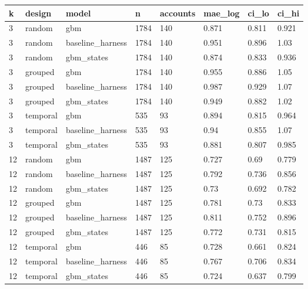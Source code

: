 \begin{tabular}{llllllll}
\toprule
k & design & model & n & accounts & mae\_log & ci\_lo & ci\_hi \\
\midrule
3 & random & gbm & 1784 & 140 & 0.871 & 0.811 & 0.921 \\
3 & random & baseline\_harness & 1784 & 140 & 0.951 & 0.896 & 1.03 \\
3 & random & gbm\_states & 1784 & 140 & 0.874 & 0.833 & 0.936 \\
3 & grouped & gbm & 1784 & 140 & 0.955 & 0.886 & 1.05 \\
3 & grouped & baseline\_harness & 1784 & 140 & 0.987 & 0.929 & 1.07 \\
3 & grouped & gbm\_states & 1784 & 140 & 0.949 & 0.882 & 1.02 \\
3 & temporal & gbm & 535 & 93 & 0.894 & 0.815 & 0.964 \\
3 & temporal & baseline\_harness & 535 & 93 & 0.94 & 0.855 & 1.07 \\
3 & temporal & gbm\_states & 535 & 93 & 0.881 & 0.807 & 0.985 \\
12 & random & gbm & 1487 & 125 & 0.727 & 0.69 & 0.779 \\
12 & random & baseline\_harness & 1487 & 125 & 0.792 & 0.736 & 0.856 \\
12 & random & gbm\_states & 1487 & 125 & 0.73 & 0.692 & 0.782 \\
12 & grouped & gbm & 1487 & 125 & 0.781 & 0.73 & 0.833 \\
12 & grouped & baseline\_harness & 1487 & 125 & 0.811 & 0.752 & 0.896 \\
12 & grouped & gbm\_states & 1487 & 125 & 0.772 & 0.731 & 0.815 \\
12 & temporal & gbm & 446 & 85 & 0.728 & 0.661 & 0.824 \\
12 & temporal & baseline\_harness & 446 & 85 & 0.767 & 0.706 & 0.834 \\
12 & temporal & gbm\_states & 446 & 85 & 0.724 & 0.637 & 0.799 \\
\bottomrule
\end{tabular}
